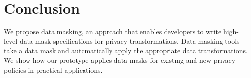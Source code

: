 \section{Conclusion}
We propose data masking, an approach that enables developers to write high-level data mask
specifications for privacy transformations. Data masking tools take a data mask and automatically
apply the appropriate data transformations. We show how our prototype applies data masks for
existing and new privacy policies in practical applications.

\iffalse
new paradigm of data ownership on the web that provides users with control over
when and how applications access their data, without overhauling the current web architecture and
business model. To realize \name, we design \sys, which minimizes the burden upon users to store or
manage their data, and makes it easy for developers to systematically express and automate the
subtle and complex data transformations needed for unsubscription and resubscription. We demonstrate
how \sys can be used in practical web applications with low overhead.
\fi
